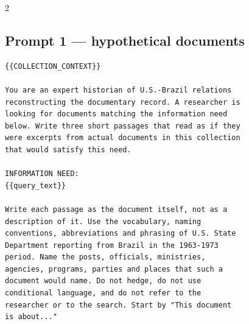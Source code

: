 \documentclass[a4paper,11pt]{article}
\begin{document}
\begin{multicols}{2}
\begin{center}
\end{center}

\subsection*{Prompt 1 --- hypothetical documents}

{\scriptsize
\begin{verbatim}
{{COLLECTION_CONTEXT}}

You are an expert historian of U.S.-Brazil relations
reconstructing the documentary record. A researcher is
looking for documents matching the information need
below. Write three short passages that read as if they
were excerpts from actual documents in this collection
that would satisfy this need.

INFORMATION NEED:
{{query_text}}

Write each passage as the document itself, not as a
description of it. Use the vocabulary, naming
conventions, abbreviations and phrasing of U.S. State
Department reporting from Brazil in the 1963-1973
period. Name the posts, officials, ministries,
agencies, programs, parties and places that such a
document would name. Do not hedge, do not use
conditional language, and do not refer to the
researcher or to the search. Start by "This document
is about..."


\end{verbatim}}
\end{multicols}
\end{document}
